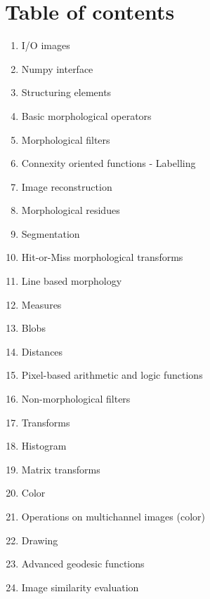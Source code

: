 
\clearpage

\section{Table of contents}

\begin{enumerate}
  \item I/O images
  \item Numpy interface
  \item Structuring elements
  \item Basic morphological operators
  \item Morphological filters
  \item Connexity oriented functions - Labelling
  \item Image reconstruction
  \item Morphological residues
  \item Segmentation
  \item Hit-or-Miss morphological transforms
  \item Line based morphology
  \item Measures
  \item Blobs
  \item Distances
  \item Pixel-based arithmetic and logic functions
  \item Non-morphological filters
  \item Transforms
  \item Histogram
  \item Matrix transforms
  \item Color
  \item Operations on multichannel images (color)
  \item Drawing
  \item Advanced geodesic functions
  \item Image similarity evaluation
\end{enumerate}

